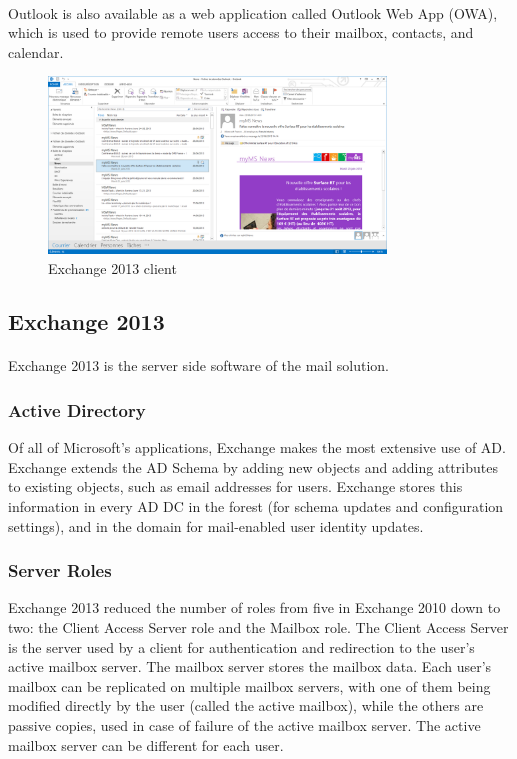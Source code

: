 \paragraph{}
Outlook is also available as a web application called Outlook Web App (OWA), which is used to provide remote users access to their mailbox, contacts, and calendar.

\begin{figure}[H]
	\centering
	\includegraphics[width=0.8\textwidth]{Schemas/exchange2013.png}
	\caption{Exchange 2013 client}
	\label{fig:background_exchange}
\end{figure}

\subsection{Exchange 2013}
\paragraph{}
Exchange 2013 is the server side software of the mail solution.


\subsubsection{Active Directory}
Of all of Microsoft's applications, Exchange makes the most extensive use of AD. 
Exchange extends the AD Schema by adding new objects and adding attributes to existing objects, such as email addresses for users.
Exchange stores this information in every AD DC in the forest (for schema updates and configuration settings), and in the domain for mail-enabled user identity updates\cite[Ch. 1]{redmond_microsoft_2010}.

\subsubsection{Server Roles}
Exchange 2013 reduced the number of roles from five in Exchange 2010 down to two: the Client Access Server role and the Mailbox role. The Client Access Server is the server used by a client for authentication and redirection to the user's active mailbox server. The mailbox server stores the mailbox data. Each user's mailbox can be replicated on multiple mailbox servers, with one of them being modified directly by the user (called the active mailbox), while the others are passive copies, used in case of failure of the active mailbox server. The active mailbox server can be different for each user\cite[Ch. 1]{redmond_microsoft_2010}.

